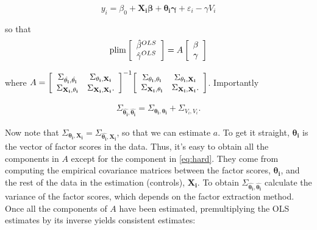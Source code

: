 \begin{equation}
y_{i} = \beta_{0} + \mathbf{X_{i}}  \mathbf{\beta} + \mathbf{\theta_{i}} \mathbf{\gamma} + \varepsilon_{i} - \gamma V_{i} \label{eq:model}
\end{equation}
 
\noindent  so that 
\begin{equation}
\operatorname{plim}  \left[ \begin{array}{c c}
                   \hat{\beta}^{OLS} \\
                    \hat{\gamma}^{OLS} \end{array} \right] = A\left[ \begin{array}{c c}
                   \beta \\
                   \gamma \end{array} \right]
\end{equation}

\noindent where $A = {\left[ \begin{array}{c c}
    \Sigma_{\hat{\mathbf{\theta_{i}}} , \hat{\mathbf{\theta_{i}}} } & \Sigma_{\mathbf{\theta_{i}} , \mathbf{X_{i}}} \\
    \Sigma_{\mathbf{X_{i}}, \mathbf{\theta_{i}}} &   \Sigma_{\mathbf{X_{i}}, \mathbf{X_{i}}}. 
  \end{array}  \right]}^{-1} {\left[ \begin{array}{c c}
    \Sigma_{\mathbf{\theta_{i}} , \mathbf{\theta_{i}} } & \Sigma_{\mathbf{\theta_{i}} , \mathbf{X_{i}}} \\
    \Sigma_{\mathbf{X_{i}}, \mathbf{\theta_{i}}} &  \Sigma_{\mathbf{X_{i}}, \mathbf{X_{i}}}. 
  \end{array}  \right]}$. Importantly 

\begin{eqnarray}
\Sigma_{\hat{\mathbf{\theta_{i}}} , \hat{\mathbf{\theta_{i}}} } = \Sigma_{\mathbf{\theta_{i}} , \mathbf{\theta_{i}} } + \Sigma_{V_{i} , V_{i} }. \label{eq:hard}
\end{eqnarray}

\indent Now note that $\Sigma_{\mathbf{\theta_{i}} , \mathbf{X_{i}} } = \Sigma_{\hat{\mathbf{\theta_{i}}} , \mathbf{X_{i}} }$, so that we can estimate $a$. To get it straight, $\mathbf{\theta_{i}}$ is the vector of factor scores in the data. Thus, it's easy to obtain all the components in $A$ except for the component in \eqref{eq:hard}. They come from computing the empirical covariance matrices between the factor scores, $\mathbf{\theta_{i}}$, and the rest of the data in the estimation (controls), $\mathbf{X_{i}}$. To obtain $\Sigma_{\hat{\mathbf{\theta_{i}}} , \hat{\mathbf{\theta_{i}}} }$ calculate the variance of the factor scores, which depends on the factor extraction method. Once all the components of $A$ have been estimated, premultiplying the OLS estimates by its inverse yields consistent estimates:

